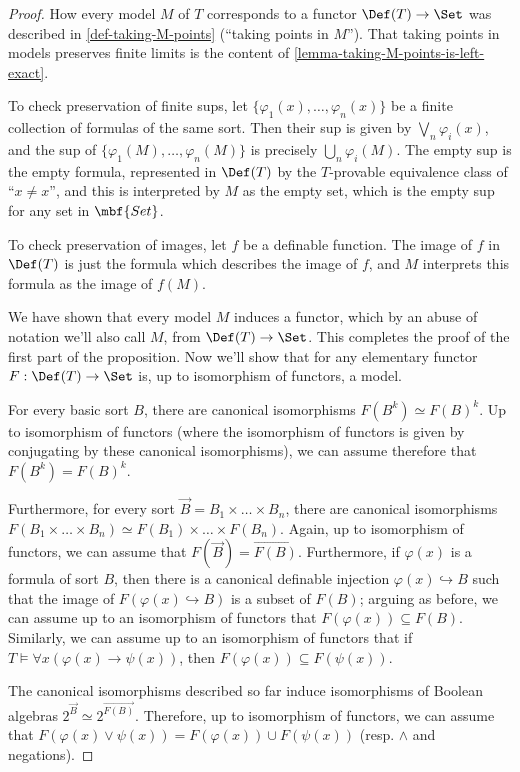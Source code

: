 \begin{proof}
  How every model $M$ of $T$ corresponds to a functor $\Def(T) \to \Set$ was described in \ref{def-taking-M-points} (``taking points in $M$''). That taking points in models preserves finite limits is the content of \ref{lemma-taking-M-points-is-left-exact}.

  To check preservation of finite sups, let $\{\varphi_1(x), \dots, \varphi_n(x)\}$ be a finite collection of formulas of the same sort. Then their sup is given by $\bigvee_{n} \varphi_i(x)$, and the sup of $\{\varphi_1(M), \dots, \varphi_n(M)\}$ is precisely $\bigcup_n \varphi_i(M)$. The empty sup is the empty formula, represented in $\Def(T)$ by the $T$-provable equivalence class of ``$x \neq x$'', and this is interpreted by $M$ as the empty set, which is the empty sup for any set in $\mbf{Set}$.

  To check preservation of images, let $f$ be a definable function. The image of $f$ in $\Def(T)$ is just the formula which describes the image of $f$, and $M$ interprets this formula as the image of $f(M)$.

  We have shown that every model $M$ induces a functor, which by an abuse of notation we'll also call $M$, from $\Def(T) \to \Set$. This completes the proof of the first part of the proposition. Now we'll show that for any elementary functor $F : \Def(T) \to \Set$ is, up to isomorphism of functors, a model.

  For every basic sort $B$, there are canonical isomorphisms $F(B^k) \simeq F(B)^k$. Up to isomorphism of functors (where the isomorphism of functors is given by conjugating by these canonical isomorphisms), we can assume therefore that $F(B^k) = F(B)^k$.

  Furthermore, for every sort $\vec{B} = B_1 \times \dots \times B_n$, there are canonical isomorphisms $F(B_1 \times \dots \times B_n) \simeq F(B_1) \times \dots \times F(B_n)$. Again, up to isomorphism of functors, we can assume that $F(\vec{B}) = \vec{F(B)}$. Furthermore, if $\varphi(x)$ is a formula of sort $B$, then there is a canonical definable injection $\varphi(x) \hookrightarrow B$ such that the image of $F(\varphi(x) \hookrightarrow B)$ is a subset of $F(B)$; arguing as before, we can assume up to an isomorphism of functors that $F(\varphi(x)) \subseteq F(B)$. Similarly, we can assume up to an isomorphism of functors that if $T \models \forall x (\varphi(x) \rightarrow \psi(x))$, then $F(\varphi(x)) \subseteq F(\psi(x))$.

  The canonical isomorphisms described so far induce isomorphisms of Boolean algebras $2^{\vec{B}} \simeq 2^{\vec{F(B)}}$. Therefore, up to isomorphism of functors, we can assume that $F(\varphi(x) \lor \psi(x)) = F(\varphi(x)) \cup F(\psi(x))$ (resp. $\land$ and negations).


\end{proof}
